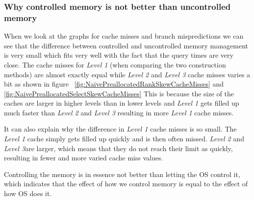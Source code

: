 \subsubsection{Why controlled memory is not better than uncontrolled memory}
When we look at the graphs for cache misses and branch mispredictions we can see that the difference between controlled and uncontrolled memory management is very small which fits very well with the fact that the query times are very close.
The cache misses for \textit{Level 1} (when comparing the two construction methods) are almost exactly equal while \textit{Level 2} and \textit{Level 3} cache misses varies a bit as shown in figure ~\ref{fig:NaivePreallocatedRankSkewCacheMisses} and \ref{fig:NaivePreallocatedSelectSkewCacheMisses}
This is because the size of the caches are larger in higher levels than in lower levels and \textit{Level 1} gets filled up much faster than \textit{Level 2} and \textit{Level 3} resulting in more \textit{Level 1} cache misses.

It can also explain why the difference in \textit{Level 1} cache misses is so small. 
The \textit{Level 1} cache simply gets filled up quickly and is then often missed. \textit{Level 2} and \textit{Level 3}are larger, which means that they do not reach their limit as quickly, resulting in fewer and more varied cache miss values.



Controlling the memory is in essence not better than letting the OS control it, which indicates that the effect of how we control memory is equal to the effect of how OS does it.







